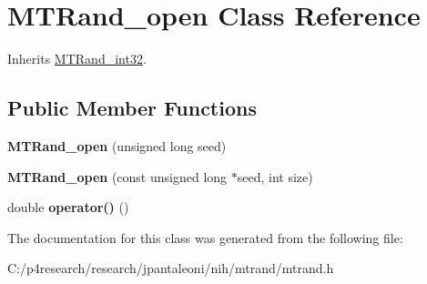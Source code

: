 \hypertarget{class_m_t_rand__open}{
\section{\-M\-T\-Rand\-\_\-open \-Class \-Reference}
\label{class_m_t_rand__open}
}


\-Inherits \hyperlink{class_m_t_rand__int32}{\-M\-T\-Rand\-\_\-int32}.

\subsection*{\-Public \-Member \-Functions}
\begin{DoxyCompactItemize}
\item 
\hypertarget{class_m_t_rand__open_a1f55ebc1052f5343f8d6e08a752ef957}{
{\bfseries \-M\-T\-Rand\-\_\-open} (unsigned long seed)}
\label{class_m_t_rand__open_a1f55ebc1052f5343f8d6e08a752ef957}

\item 
\hypertarget{class_m_t_rand__open_a0216992f4dfa5acf22ee8c585eeac488}{
{\bfseries \-M\-T\-Rand\-\_\-open} (const unsigned long $\ast$seed, int size)}
\label{class_m_t_rand__open_a0216992f4dfa5acf22ee8c585eeac488}

\item 
\hypertarget{class_m_t_rand__open_ac408aa400ca59fc2afc888d88f98d807}{
double {\bfseries operator()} ()}
\label{class_m_t_rand__open_ac408aa400ca59fc2afc888d88f98d807}

\end{DoxyCompactItemize}


\-The documentation for this class was generated from the following file\-:\begin{DoxyCompactItemize}
\item 
\-C\-:/p4research/research/jpantaleoni/nih/mtrand/mtrand.\-h\end{DoxyCompactItemize}

